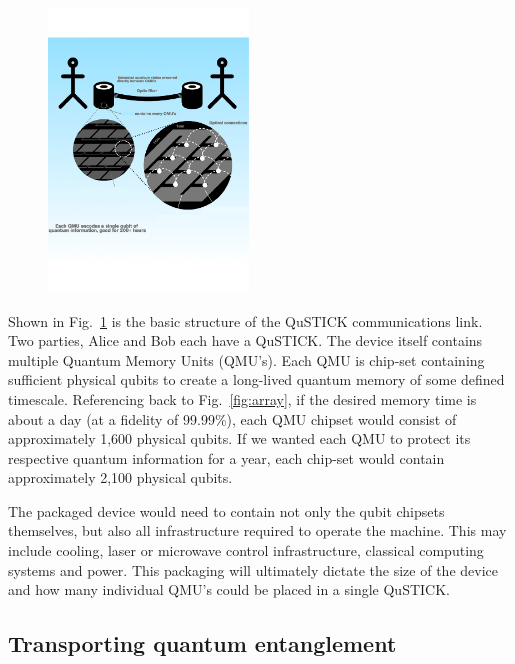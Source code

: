 \documentclass[twocolumn, aps, rmp, amsmath, amssymb, nofootinbib, superscriptaddress, longbibliography, floatfix, table-of-contents, eqsecnum]{revtex4-2}
\begin{document}
\begin{figure}[htbp!]
	\includegraphics[clip=true, width=0.475\textwidth]{qustick1}
	\caption{} \label{fig:qustick1}
\end{figure}

Shown in Fig.~\ref{fig:qustick1} is the basic structure of the QuSTICK communications link. Two parties, Alice and Bob each have a QuSTICK. The device itself contains multiple Quantum Memory Units (QMU's). Each QMU is chip-set containing sufficient physical qubits to create a long-lived quantum memory of some defined timescale. Referencing back to Fig.~\ref{fig:array}, if the desired memory time is about a day (at a fidelity of 99.99\%), each QMU chipset would consist of approximately 1,600 physical qubits. If we wanted each QMU to protect its respective quantum information for a year, each chip-set would contain approximately 2,100 physical qubits. 

The packaged device would need to contain not only the qubit chipsets themselves, but also all infrastructure required to operate the machine. This may include cooling, laser or microwave control infrastructure, classical computing systems and power. This packaging will ultimately dictate the size of the device and how many individual QMU's could be placed in a single QuSTICK.

\subsection{Transporting quantum entanglement}
\end{document}
